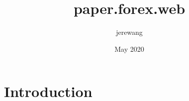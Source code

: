 \documentclass{article}
\title{paper.forex.web}
\author{jerewang }
\date{May 2020}
\begin{document}
\maketitle

\section{Introduction}
\end{document}
